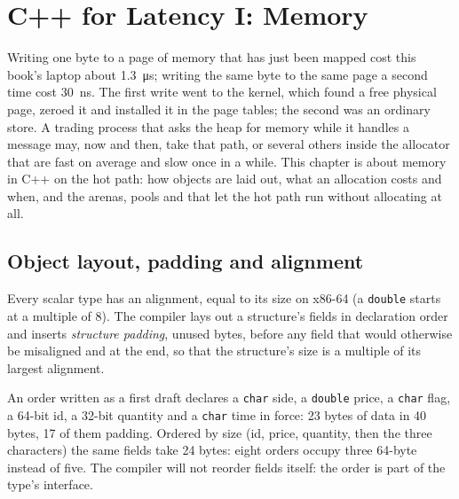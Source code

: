 \chapter{C++ for Latency I: Memory}\label{ch:ll:cpp-for-latency-i-memory}

Writing one byte to a page of memory that has just been mapped cost this book's laptop about \qty{1.3}{\micro\second};
writing the same byte to the same page a second time cost \qty{30}{\nano\second}. The first write went to the kernel,
which found a free physical page, zeroed it and installed it in the page tables; the second was an ordinary store. A
trading process that asks the heap for memory while it handles a message may, now and then, take that path, or several
others inside the allocator that are fast on average and slow once in a while. This chapter is about memory in C++ on
the hot path: how objects are laid out, what an allocation costs and when, and the arenas, pools and  that let the hot path run without allocating at all.

\section{Object layout, padding and alignment}

\begin{definition}\label{def:ll:cpp-for-latency-i-memory:padding}
Every scalar type has an alignment, equal to its size on x86-64 (a \texttt{double} starts at a multiple of 8). The
compiler lays out a structure's fields in declaration order and inserts \emph{structure padding}, unused bytes, before any field that would otherwise be misaligned and at the end, so that the structure's size
is a multiple of its largest alignment.
\end{definition}

\begin{example}\label{ex:ll:cpp-for-latency-i-memory:layout}
An order written as a first draft declares a \texttt{char} side, a \texttt{double} price, a \texttt{char} flag, a 64-bit
id, a 32-bit quantity and a \texttt{char} time in force: 23 bytes of data in 40 bytes, 17 of them padding. Ordered by size
(id, price, quantity, then the three characters) the same fields take 24 bytes: eight orders occupy three 64-byte 
instead of five. The compiler will not reorder fields itself: the order is part of the type's interface.
\end{example}

